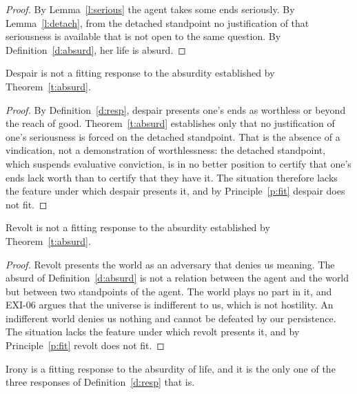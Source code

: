 \documentclass{situationist-preprint}
\begin{document}
\begin{proof}
By Lemma~\ref{l:serious} the agent takes some ends seriously. By Lemma~\ref{l:detach}, from the detached standpoint no justification of that seriousness is available that is not open to the same question. By Definition~\ref{d:absurd}, her life is absurd.
\end{proof}

\begin{proposition}\label{p:despair}
Despair is not a fitting response to the absurdity established by Theorem~\ref{t:absurd}.
\end{proposition}

\begin{proof}
By Definition~\ref{d:resp}, despair presents one's ends as worthless or beyond the reach of good. Theorem~\ref{t:absurd} establishes only that no justification of one's seriousness is forced on the detached standpoint. That is the absence of a vindication, not a demonstration of worthlessness: the detached standpoint, which suspends evaluative conviction, is in no better position to certify that one's ends lack worth than to certify that they have it. The situation therefore lacks the feature under which despair presents it, and by Principle~\ref{p:fit} despair does not fit.
\end{proof}

\begin{proposition}\label{p:revolt}
Revolt is not a fitting response to the absurdity established by Theorem~\ref{t:absurd}.
\end{proposition}

\begin{proof}
Revolt presents the world as an adversary that denies us meaning. The absurd of Definition~\ref{d:absurd} is not a relation between the agent and the world but between two standpoints of the agent. The world plays no part in it, and EXI-06 argues that the universe is indifferent to us, which is not hostility. An indifferent world denies us nothing and cannot be defeated by our persistence. The situation lacks the feature under which revolt presents it, and by Principle~\ref{p:fit} revolt does not fit.
\end{proof}

\begin{theorem}\label{t:irony}
Irony is a fitting response to the absurdity of life, and it is the only one of the three responses of Definition~\ref{d:resp} that is.
\end{theorem}
\end{document}
